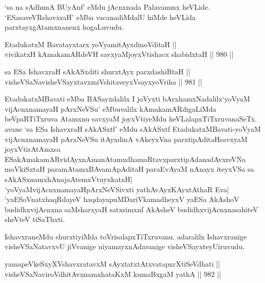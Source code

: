 \begin{artha}
`sa na sAdhunA BUyAnf' eMdu jAcnxnada Palavanunx heVLide. `ESasaveVRshavxraH' eMba vacanadiMdalU hiMde heVLida parxtayxgAtamxnanenx hogaLuvudu.
\end{artha}


\begin{shl}
EtadukatxM Bavatayxtarx yoV\s yamitAyxdinoVditaH || \\
vivikatxH kAmakamARdeVH savxyaMjoyxVtishacx shabidxtaH \hfill || 980 ||  
\end{shl}
				
\begin{shl}
sa ESa IshavxraH sAkASxditi shurxtAyx parxdashiRtaH || \\
visheVSaNavisheVSayxtavxmiVshitaveyxVsayxyoVriha \hfill || 981 ||  
\end{shl}

\begin{artha}
EtadukatxMBavati eMba BASayxdalilx I joVyxti bArxhamxNadalilx\break `yoV\s yaM vijAcnxnamayaH pArxNeVSu' eMbuvalilx kAmakamARdigaLiMda beVpaRTiTxruva Atamxnu savxyaM joyxVtiyeMdu heVLalapxTiTxruvanaSeTx. avane `sa ESa IshavxraH sAkASxtf' eMdu sAkASxtf EtadukatxMBavati-yoV\s yaM vijAcnxnamayaH pArxNeVSu itAyxdinA vAkeyxVna parxtipAditaHsavxyaM joyxVtirAtAmxsa ESakAmakamARvidAyxnAma\-\break nAtamxdhamaRtavxparxtipAdanadAvxreVNa moVkiSxtaH paramAtamxBAva\break mApAditaH paraEvAyaM nAnayx iteyxVSa sa sAkASxnamxhAnaja\break AtemxVtuyxkatxH| `yoV\s yaMvijAcnxnamayaHpArxNeVSivxti yathA\break vAyxKAyxtAthaR Eva| `yaESoV\s natxhaqRdayeV haqdayapuMDariVkamadheyxV yaESa AkAshoV budidhxvijAcnxna saMsharxyaH satxsimxnf AkAsheV budidhxvijAcnxnasahiteV sheVteV tiSaThxti.
\end{artha}

\begin{artha}
IshavxraneMdu shurxtiyiMda toVrisalapxTiTxruvanu. adaralilx Ishavxranige visheVSaNatavxvU jiVvanige niyamayxnAdavanige visheVSayxteyU\break iruvudu.
\end{artha}


\begin{shl}
yamapeVkeSxyXVshavxratavxM sAyxtatxtAtxvatapxrXtiSeVdhati || \\
visheVSaNaviroVdhitAvxnamxhataKxM kumaBxgaM yathA \hfill || 982 ||  
\end{shl}

